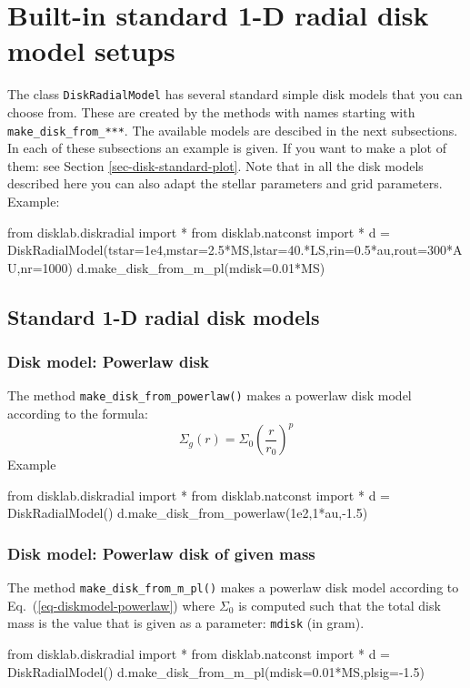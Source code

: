 \documentclass{book}
\newcommand{\code}[1]{{\small\tt #1}}
\begin{document}
\chapter{Built-in standard 1-D radial disk model setups}\label{chap-standard-disk-models}
The class \code{DiskRadialModel} has several standard simple disk models that
you can choose from. These are created by the methods with names starting
with \code{make\_disk\_from\_***}. The available models are descibed in the
next subsections. In each of these subsections an example is given. If you
want to make a plot of them: see Section \ref{sec-disk-standard-plot}.
Note that in all the disk models described here you can also adapt the
stellar parameters and grid parameters. Example:
\begin{codebox}
from disklab.diskradial import *
from disklab.natconst import *
d = DiskRadialModel(tstar=1e4,mstar=2.5*MS,lstar=40.*LS,rin=0.5*au,rout=300*AU,nr=1000)
d.make_disk_from_m_pl(mdisk=0.01*MS)
\end{codebox}

\section{Standard 1-D radial disk models}\label{sec-standard-disk-models}
\subsection{Disk model: Powerlaw disk}
The method \code{make\_disk\_from\_powerlaw()} makes a powerlaw disk model
according to the formula:
\begin{equation}\label{eq-diskmodel-powerlaw}
\Sigma_g(r) = \Sigma_0 \left(\frac{r}{r_0}\right)^p
\end{equation}
Example
\begin{codebox}
from disklab.diskradial import *
from disklab.natconst import *
d = DiskRadialModel()
d.make_disk_from_powerlaw(1e2,1*au,-1.5)
\end{codebox}

\subsection{Disk model: Powerlaw disk of given mass}\label{sec-standard-powerlaw}
The method \code{make\_disk\_from\_m\_pl()} makes a powerlaw disk model
according to Eq.~(\ref{eq-diskmodel-powerlaw})
where $\Sigma_0$ is computed such that the total disk mass is the value that
is given as a parameter: \code{mdisk} (in gram).
\begin{codebox}
from disklab.diskradial import *
from disklab.natconst import *
d = DiskRadialModel()
d.make_disk_from_m_pl(mdisk=0.01*MS,plsig=-1.5)
\end{codebox}
\end{document}
